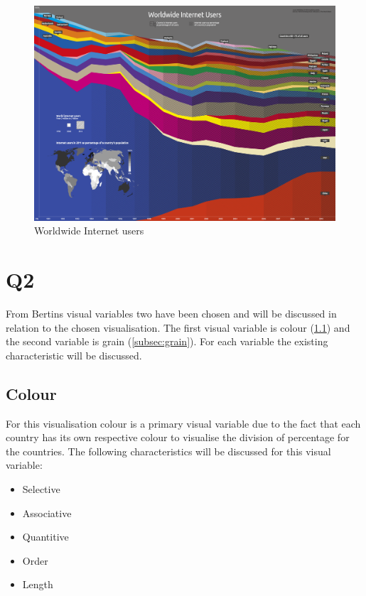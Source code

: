 \documentclass[11pt,a4paper]{article}
\begin{document}
\begin{figure}[ht]
\centering
\includegraphics[scale=0.08]{visualisation1}	
\caption*{Worldwide Internet users}
\end{figure}

\section{Q2}
From Bertins visual variables two have been chosen and will be discussed in relation to the chosen visualisation. The first visual variable is colour (\ref{subsec:colour}) and the second variable is grain (\ref{subsec:grain}). For each variable the existing characteristic will be discussed.\\

\subsection{Colour}\label{subsec:colour}
For this visualisation colour is a primary visual variable due to the fact that each country has its own respective colour to visualise the division of percentage for the countries. 
The following characteristics will be discussed for this visual variable: 

\begin{itemize}[noitemsep]
	\item Selective
	\item Associative
	\item Quantitive
	\item Order
	\item Length
\end{itemize}
\end{document}
